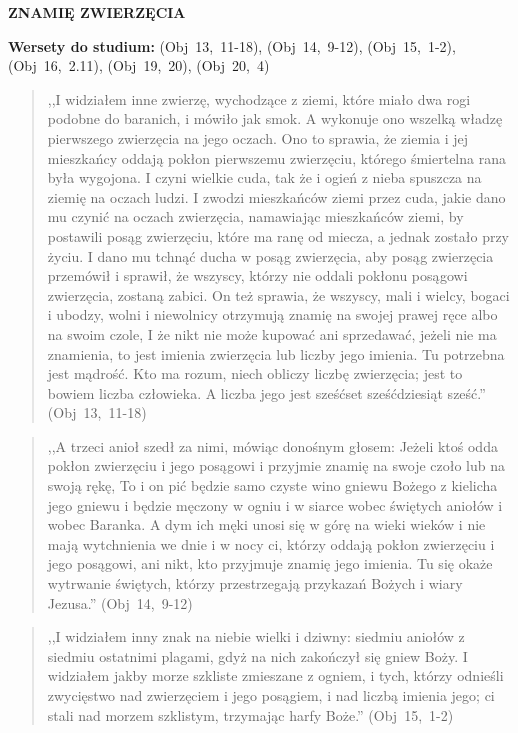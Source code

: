 \documentclass[10pt,a4paper,oneside]{article}
\begin{document}
\centerline{\textbf{\MakeUppercase{Znamię Zwierzęcia}}}
\begin{center}
\textbf{Wersety do studium:} \mbox{(Obj 13, 11-18)}, \mbox{(Obj 14, 9-12)}, \mbox{(Obj 15, 1-2)}, \mbox{(Obj 16, 2.11)}, \mbox{(Obj 19, 20)}, \mbox{(Obj 20, 4)}
\end{center}
\begin{quote}
,,I widziałem inne zwierzę, wychodzące z ziemi, które miało dwa rogi podobne do baranich, i mówiło jak smok. A wykonuje ono wszelką władzę pierwszego zwierzęcia na jego oczach. Ono to sprawia, że ziemia i jej mieszkańcy oddają pokłon pierwszemu zwierzęciu, którego śmiertelna rana była wygojona. I czyni wielkie cuda, tak że i ogień z nieba spuszcza na ziemię na oczach ludzi. I zwodzi mieszkańców ziemi przez cuda, jakie dano mu czynić na oczach zwierzęcia, namawiając mieszkańców ziemi, by postawili posąg zwierzęciu, które ma ranę od miecza, a jednak zostało przy życiu. I dano mu tchnąć ducha w posąg zwierzęcia, aby posąg zwierzęcia przemówił i sprawił, że wszyscy, którzy nie oddali pokłonu posągowi zwierzęcia, zostaną zabici. On też sprawia, że wszyscy, mali i wielcy, bogaci i ubodzy, wolni i niewolnicy otrzymują znamię na swojej prawej ręce albo na swoim czole, I że nikt nie może kupować ani sprzedawać, jeżeli nie ma znamienia, to jest imienia zwierzęcia lub liczby jego imienia. Tu potrzebna jest mądrość. Kto ma rozum, niech obliczy liczbę zwierzęcia; jest to bowiem liczba człowieka. A liczba jego jest sześćset sześćdziesiąt sześć.'' \mbox{(Obj 13, 11-18)}
\end{quote}
\begin{quote}
,,A trzeci anioł szedł za nimi, mówiąc donośnym głosem: Jeżeli ktoś odda pokłon zwierzęciu i jego posągowi i przyjmie znamię na swoje czoło lub na swoją rękę, To i on pić będzie samo czyste wino gniewu Bożego z kielicha jego gniewu i będzie męczony w ogniu i w siarce wobec świętych aniołów i wobec Baranka. A dym ich męki unosi się w górę na wieki wieków i nie mają wytchnienia we dnie i w nocy ci, którzy oddają pokłon zwierzęciu i jego posągowi, ani nikt, kto przyjmuje znamię jego imienia. Tu się okaże wytrwanie świętych, którzy przestrzegają przykazań Bożych i wiary Jezusa.'' \mbox{(Obj 14, 9-12)}
\end{quote}
\begin{quote}
,,I widziałem inny znak na niebie wielki i dziwny: siedmiu aniołów z siedmiu ostatnimi plagami, gdyż na nich zakończył się gniew Boży. I widziałem jakby morze szkliste zmieszane z ogniem, i tych, którzy odnieśli zwycięstwo nad zwierzęciem i jego posągiem, i nad liczbą imienia jego; ci stali nad morzem szklistym, trzymając harfy Boże.'' \mbox{(Obj 15, 1-2)}
\end{quote}
\end{document}
